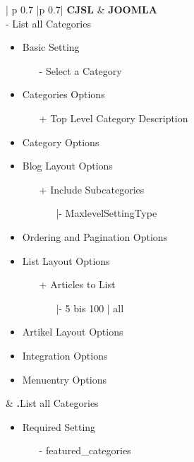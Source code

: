 \begin{minipage}{0.7\textwidth}
\begin{longtable}{| p {0.7\textwidth} |p {0.7\textwidth}|}
\hline
\textbf{CJSL} 
&  
\textbf{JOOMLA} \\ - List all Categories
  \begin{itemize}
    \item Basic  Setting 
   		\begin{enumerate}
   			\item[-] Select a Category
   		\end{enumerate}
   	\item Categories Options
	   	\begin{enumerate}
	    \item[+] Top Level Category Description
	   \end{enumerate}
   	\item Category Options
   	\item Blog Layout Options
   		\begin{enumerate}
   	   			\item[+] Include Subcategories
   			         \begin{enumerate}
   			          \item[|-] MaxlevelSettingType
   			         \end{enumerate}
   	   		\end{enumerate}
   	\item Ordering and Pagination Options
   	\item List Layout Options
   	\begin{enumerate}
   	\item[+] Articles to List
   			\begin{enumerate}
   				\item[|-] 5 bis 100 | all
   			\end{enumerate}
   	\end{enumerate}
   	\item Artikel Layout Options
   	\item Integration Options
   	\item Menuentry Options
 \end{itemize}
&
\textbf{.}List all Categories
	 \begin{itemize}
       \item Required  Setting 
      		\begin{enumerate}
      			\item[-] featured\_categories
      		\end{enumerate}

\end{itemize}
\end{longtable}
\end{minipage}
